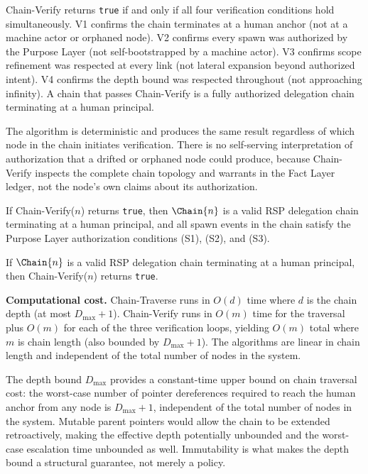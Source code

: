Chain-Verify returns \texttt{true} if and only if all four verification conditions hold simultaneously. V1 confirms the chain terminates at a human anchor (not at a machine actor or orphaned node). V2 confirms every spawn was authorized by the Purpose Layer (not self-bootstrapped by a machine actor). V3 confirms scope refinement was respected at every link (not lateral expansion beyond authorized intent). V4 confirms the depth bound was respected throughout (not approaching infinity). A chain that passes Chain-Verify is a fully authorized delegation chain terminating at a human principal.

The algorithm is deterministic and produces the same result regardless of which node in the chain initiates verification. There is no self-serving interpretation of authorization that a drifted or orphaned node could produce, because Chain-Verify inspects the complete chain topology and warrants in the Fact Layer ledger, not the node's own claims about its authorization.

\begin{prop}
\label{prop:chain-verify-soundness}
If Chain-Verify($n$) returns \texttt{true}, then $\Chain{n}$ is a valid RSP delegation chain terminating at a human principal, and all spawn events in the chain satisfy the Purpose Layer authorization conditions (S1), (S2), and (S3).
\end{prop}

\begin{prop}
\label{prop:chain-verify-completeness}
If $\Chain{n}$ is a valid RSP delegation chain terminating at a human principal, then Chain-Verify($n$) returns \texttt{true}.
\end{prop}

\medskip
\noindent\textbf{Computational cost.} Chain-Traverse runs in $O(d)$ time where $d$ is the chain depth (at most $D_{\max} + 1$). Chain-Verify runs in $O(m)$ time for the traversal plus $O(m)$ for each of the three verification loops, yielding $O(m)$ total where $m$ is chain length (also bounded by $D_{\max} + 1$). The algorithms are linear in chain length and independent of the total number of nodes in the system.

The depth bound $D_{\max}$ provides a constant-time upper bound on chain traversal cost: the worst-case number of pointer dereferences required to reach the human anchor from any node is $D_{\max} + 1$, independent of the total number of nodes in the system. Mutable parent pointers would allow the chain to be extended retroactively, making the effective depth potentially unbounded and the worst-case escalation time unbounded as well. Immutability is what makes the depth bound a structural guarantee, not merely a policy.

